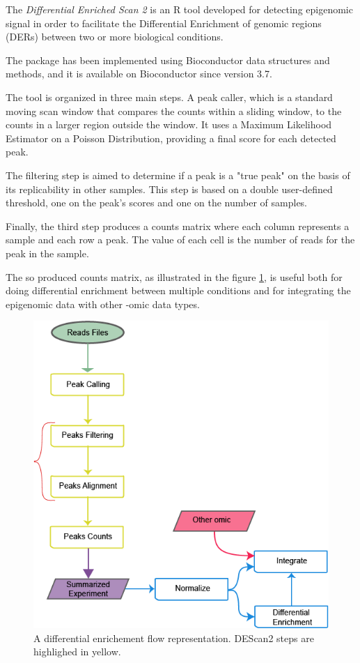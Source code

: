 The \textit{Differential Enriched Scan 2} is an R \cite{Ihaka1996} tool developed for detecting epigenomic signal in order to facilitate the Differential Enrichment of genomic regions (DERs) between two or more biological conditions.

The package has been implemented using Bioconductor \cite{Gentleman2004} data structures and methods, and it is available on Bioconductor since version 3.7.

The tool is organized in three main steps. 
A peak caller, which is a standard moving scan window that compares the counts within a sliding window, to the counts in a larger region outside the window. It uses a Maximum Likelihood Estimator on a Poisson Distribution, providing a final score for each detected peak.

The filtering step is aimed to determine if a peak is a "true peak" on the basis of its replicability in other samples. This step is based on a double user-defined threshold, one on the peak's scores and one on the number of samples.


Finally, the third step produces a counts matrix where each column represents a sample and each row a peak. The value of each cell is the number of reads for the peak in the sample.

The so produced counts matrix, as illustrated in the figure \ref{fig:descan2flow}, is useful both for doing differential enrichment between multiple conditions and for integrating the epigenomic data with other -omic data types.

\begin{figure}[H]
\centering
\includegraphics[width=\textwidth,height=\textheight,keepaspectratio]{img/descan2/flow.png}
\caption[DEScan2 workflow]{A differential enrichement flow representation. DEScan2 steps are highlighed in yellow.}
\label{fig:descan2flow}

\end{figure}


